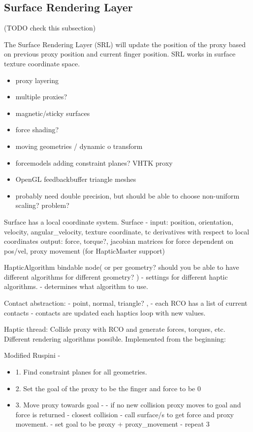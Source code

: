 \subsection{Surface Rendering Layer}
(TODO check this subsection)

The Surface Rendering Layer (SRL) will update the position of the
proxy based on previous proxy position and current finger
position. SRL works in surface texture coordinate space.

\begin{itemize}
\item proxy layering
\item multiple proxies?
\item magnetic/sticky surfaces
\item force shading?
\item moving geometries / dynamic o transform 
\item forcemodels adding constraint planes? VHTK proxy
\item OpenGL feedbackbuffer triangle meshes
\item probably need double precision, but should be able to choose
non-uniform scaling? problem?
\end{itemize}

Surface has a local coordinate system.
Surface - input: position, orientation, velocity, angular\_velocity,
texture coordinate, tc derivatives with respect to local coordinates
         output: force, torque?, jacobian matrices for force dependent
         on pos/vel, proxy movement (for HapticMaster support)


HapticAlgorithm bindable node( or per geometry? should you be able to
have different algorithms for different geometry? )
- settings for different haptic algorithms.
- determines what algorithm to use.

Contact abstraction:
- point, normal, triangle? , 
- each RCO has a list of current contacts
- contacts are updated each haptics loop with new values.

Haptic thread:
Collide proxy with RCO and generate forces, torques, etc. Different
rendering algorithms possible. Implemented from the beginning:


Modified Ruspini - 
\begin{itemize}
\item 1. Find constraint planes for all geometries.
\item 2. Set the goal of the proxy to be the finger and force to be 0
\item 3. Move proxy towards goal - 
  - if no new collision proxy moves to goal and force is returned
  - closest collision - call surface/s to get force and proxy movement.
  - set goal to be proxy + proxy\_movement 
  - repeat 3
\end{itemize}


 


